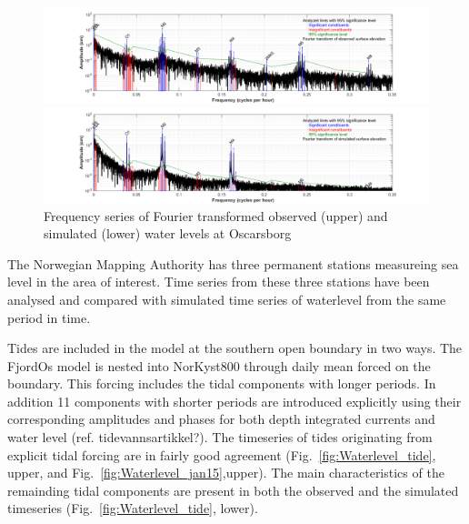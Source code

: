 \documentclass[12pt,a4paper,english]{article}
\begin{document}
\begin{figure}[t]
\centerline{
\includegraphics*[trim=3cm 0cm 2.5cm 0cm,clip=true,width=\textwidth]{Figurer/Oscarsborg_Tide_Frequency_obs.png} 
}
\centerline{
\includegraphics*[trim=3cm 0cm 2.5cm 0cm,clip=true,width=\textwidth]{Figurer/Oscarsborg_Tide_Frequency_sim.png}
}
\caption{\small
Frequency series of Fourier transformed observed (upper) and simulated (lower) water levels at Oscarsborg}
\label{fig:Waterlevel_freq}
\end{figure}

The Norwegian Mapping Authority has three permanent stations measureing sea level in the area of interest. Time series from these three stations have been analysed and compared with simulated time series of waterlevel from the same period in time.

Tides are included in the model at the southern open boundary in two ways. The FjordOs model is nested into NorKyst800 through daily mean forced on the boundary. This forcing includes the tidal components with longer periods. In addition 11 components with shorter periods are introduced explicitly using their corresponding amplitudes and phases for both depth integrated currents and water level (ref. tidevannsartikkel?). The timeseries of tides originating from explicit tidal forcing are in fairly good agreement (Fig.~\ref{fig:Waterlevel_tide}, upper, and Fig.~\ref{fig:Waterlevel_jan15},upper). The main characteristics of the remainding tidal components are present in both the observed and the simulated timeseries (Fig.~\ref{fig:Waterlevel_tide}, lower).
 
\end{document}
